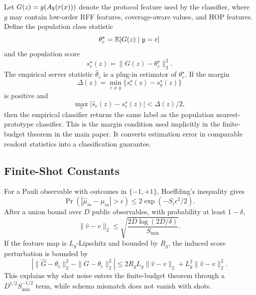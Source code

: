 Let \(G(z)=g(A_{\mathsf{S}}(r(x)))\) denote the protocol feature used by the classifier, where \(g\) may contain low-order RFF features, coverage-aware values, and HOP features. Define the population class statistic
\begin{equation}
    \theta_c^\star=\mathbb{E}[G(z)\mid y=c]
\end{equation}
and the population score
\begin{equation}
    s_c^\star(z)=\|G(z)-\theta_c^\star\|_2^2.
\end{equation}
The empirical server statistic \(\hat{\theta}_c\) is a plug-in estimator of \(\theta_c^\star\). If the margin
\begin{equation}
    \Delta(z)=\min_{c\neq y}\{s_c^\star(z)-s_y^\star(z)\}
\end{equation}
is positive and
\begin{equation}
    \max_c | \hat{s}_c(z)-s_c^\star(z)| < \Delta(z)/2,
\end{equation}
then the empirical classifier returns the same label as the population nearest-prototype classifier. This is the margin condition used implicitly in the finite-budget theorem in the main paper. It converts estimation error in comparable readout statistics into a classification guarantee.

\subsection{Finite-Shot Constants}

For a Pauli observable with outcomes in \(\{-1,+1\}\), Hoeffding's inequality gives
\begin{equation}
    \Pr(|\hat{\mu}_{ia}-\mu_{ia}|>\epsilon)
    \le 2\exp(-S_i\epsilon^2/2).
\end{equation}
After a union bound over \(D\) public observables, with probability at least \(1-\delta\),
\begin{equation}
    \|\hat{v}-v\|_2
    \le
    \sqrt{\frac{2D\log(2D/\delta)}{S_{\min}}}.
\end{equation}
If the feature map is \(L_g\)-Lipschitz and bounded by \(R_g\), the induced score perturbation is bounded by
\begin{equation}
    |\|\hat{G}-\theta_c\|_2^2-\|G-\theta_c\|_2^2|
    \le
    2R_gL_g\|\hat{v}-v\|_2+L_g^2\|\hat{v}-v\|_2^2.
\end{equation}
This explains why shot noise enters the finite-budget theorem through a \(D^{1/2}S_{\min}^{-1/2}\) term, while schema mismatch does not vanish with shots.

